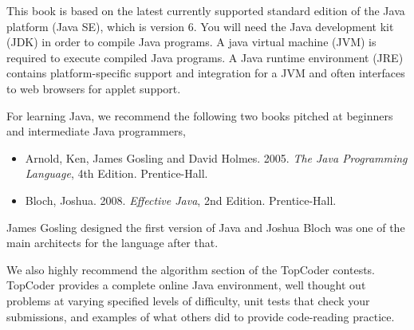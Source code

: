 
\noindent
This book is based on the latest currently supported standard edition
of the Java platform (Java SE), which is version 6.  You will need the
Java development kit (JDK) in order to compile Java programs.  A java
virtual machine (JVM) is required to execute compiled Java programs.
A Java runtime environment (JRE) contains platform-specific support
and integration for a JVM and often interfaces to web browsers for
applet support.


\noindent
For learning Java, we recommend the following two books pitched at
beginners and intermediate Java programmers,
%
\begin{itemize}
\item Arnold, Ken, James Gosling and David Holmes.  2005.
{\it The Java Programming Language}, 4th Edition.  Prentice-Hall.
\item Bloch, Joshua. 2008. {\it Effective Java}, 2nd Edition.  Prentice-Hall.
\end{itemize}
%
James Gosling designed the first version of Java and Joshua Bloch was
one of the main architects for the language after that.

We also highly recommend the algorithm section of the TopCoder
contests.  TopCoder provides a complete online Java environment, well
thought out problems at varying specified levels of difficulty, unit
tests that check your submissions, and examples of what others did to
provide code-reading practice.
%
\begin{quote}
\end{quote}
%





